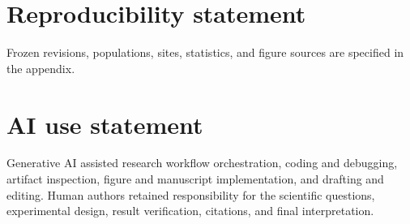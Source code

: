 \documentclass{article}
\begin{document}
\section*{Reproducibility statement}
Frozen revisions, populations, sites, statistics, and figure sources are specified in the appendix.
\section*{AI use statement}
Generative AI assisted research workflow orchestration, coding and debugging, artifact inspection, figure and manuscript implementation, and drafting and editing. Human authors retained responsibility for the scientific questions, experimental design, result verification, citations, and final interpretation.


\clearpage
\appendix

\end{document}
